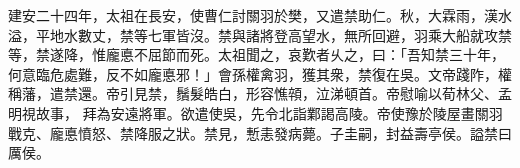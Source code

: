 \begin{pinyinscope}
 
建安二十四年，太祖在長安，使曹仁討關羽於樊，又遣禁助仁。秋，大霖雨，漢水溢，平地水數丈，禁等七軍皆沒。禁與諸將登高望水，無所回避，羽乘大船就攻禁等，禁遂降，惟龐悳不屈節而死。太祖聞之，哀歎者乆之，曰：「吾知禁三十年，何意臨危處難，反不如龐悳邪！」會孫權禽羽，獲其衆，禁復在吳。文帝踐阼，權稱藩，遣禁還。帝引見禁，鬚髮皓白，形容憔顇，泣涕頓首。帝慰喻以荀林父、孟明視故事，
 拜為安遠將軍。欲遣使吳，先令北詣鄴謁高陵。帝使豫於陵屋畫關羽戰克、龐悳憤怒、禁降服之狀。禁見，慙恚發病薨。子圭嗣，封益壽亭侯。謚禁曰厲侯。
 
 
\end{pinyinscope}